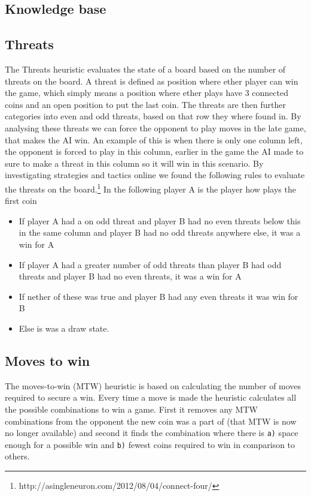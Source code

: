 \documentclass[a4paper, titlepage]{article}
\begin{document}
\subsection*{Knowledge base}


\subsection*{Threats}
The Threats heuristic evaluates the state of a board based on the number of threats on the board. 
A threat is defined as position where ether player can win the game, which simply means a position
where ether plays have 3 connected coins and an open position to put the last coin. 
The threats are then further categories into even and odd threats, based on that row they where found in.
By analysing these threats we can force the opponent to play moves in the late game, that makes the AI win.
An example of this is when there is only one column left, the opponent is forced to play in this column, 
earlier in the game the AI made to sure to make a threat in this column so it will win in this scenario. 
By investigating strategies and tactics online we found the following rules to evaluate the threats on the board.\footnote{http://asingleneuron.com/2012/08/04/connect-four/}
In the following player A is the player how plays the first coin
\begin{itemize} 
	\item If player A had a on odd threat and player B had no even threats below this in the same column and player B had no odd threats anywhere else, it was a win for A
	\item If player A had a greater number of odd threats than player B had odd threats and player B had no even threats, it was a win for A	
	\item If nether of these was true and player B had any even threats it was win for B
	\item Else is was a draw state.
\end{itemize} 

\subsection*{Moves to win}
The moves-to-win (MTW) heuristic is based on calculating the number of moves required to 
secure a win. Every time a move is made the heuristic calculates all the possible 
combinations to win a game. First it removes any MTW combinations from the opponent
the new coin was a part of (that MTW is now no longer available) and second it finds 
the combination where there is \texttt{a)} space enough for a possible win and 
\texttt{b)} fewest coins required to win in comparison to others.
\end{document}

